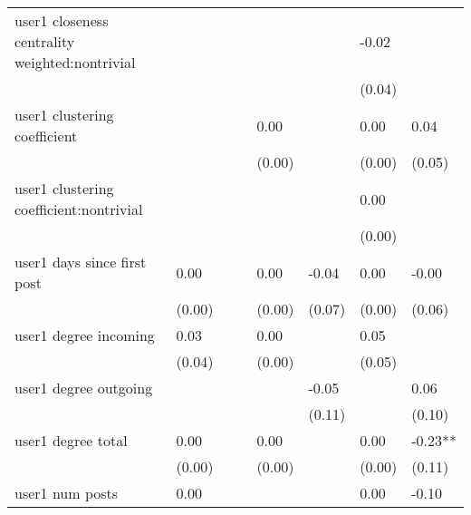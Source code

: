 \begin{table}
\begin{center}
\begin{tabular}{llllllll}
user1 closeness centrality weighted:nontrivial   &          &            &         &         &          & -0.02              &           \\
                                                 &          &            &         &         &          & (0.04)             &           \\
user1 clustering coefficient                     &          &            &         & 0.00    &          & 0.00               & 0.04      \\
                                                 &          &            &         & (0.00)  &          & (0.00)             & (0.05)    \\
user1 clustering coefficient:nontrivial          &          &            &         &         &          & 0.00               &           \\
                                                 &          &            &         &         &          & (0.00)             &           \\
user1 days since first post                      & 0.00     &            &         & 0.00    & -0.04    & 0.00               & -0.00     \\
                                                 & (0.00)   &            &         & (0.00)  & (0.07)   & (0.00)             & (0.06)    \\
user1 degree incoming                            & 0.03     &            &         & 0.00    &          & 0.05               &           \\
                                                 & (0.04)   &            &         & (0.00)  &          & (0.05)             &           \\
user1 degree outgoing                            &          &            &         &         & -0.05    &                    & 0.06      \\
                                                 &          &            &         &         & (0.11)   &                    & (0.10)    \\
user1 degree total                               & 0.00     &            &         & 0.00    &          & 0.00               & -0.23**   \\
                                                 & (0.00)   &            &         & (0.00)  &          & (0.00)             & (0.11)    \\
user1 num posts                                  & 0.00     &            &         &         &          & 0.00               & -0.10     \\

\end{tabular}
\end{center}
\end{table}
